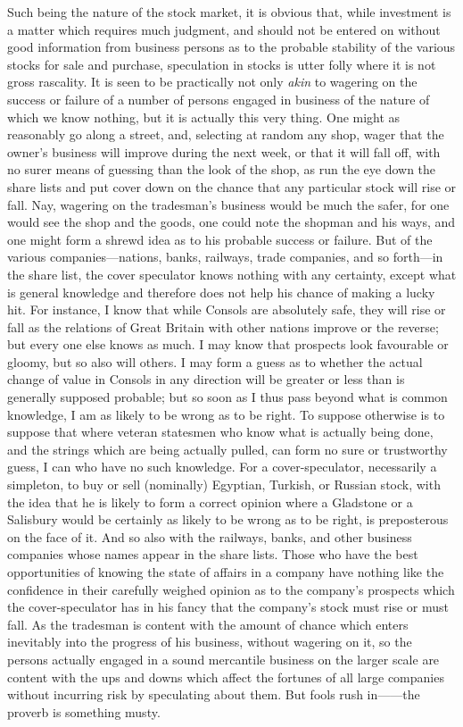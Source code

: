 \documentclass[letterpaper,12pt,oneside,openany]{memoir}
\begin{document}
Such being the nature of the stock market, it is
obvious that, while investment is a matter which
requires much judgment, and should not be entered on
without good information from business persons as to
the probable stability of the various stocks for sale and
purchase, speculation in stocks is utter folly where it is
not gross rascality. It is seen to be practically not
only \emph{akin} to wagering on the success or failure of a
number of persons engaged in business of the nature of
which we know nothing, but it is actually this very
thing. One might as reasonably go along a street, and,
selecting at random any shop, wager that the owner's
business will improve during the next week, or that it
will fall off, with no surer means of guessing than the
look of the shop, as run the eye down the share lists
and put cover down on the chance that any particular
stock will rise or fall. Nay, wagering on the tradesman's
business would be much the safer, for one would
see the shop and the goods, one could note the shopman
and his ways, and one might form a shrewd idea as to
his probable success or failure. But of the various
companies---nations, banks, railways, trade companies,
and so forth---in the share list, the cover speculator
knows nothing with any certainty, except what is general
knowledge and therefore does not help his chance of
making a lucky hit. For instance, I know that while
Consols are absolutely safe, they will rise or fall as the
relations of Great Britain with other nations improve
or the reverse; but every one else knows as much. I
may know that prospects look favourable or gloomy,
but so also will others. I may form a guess as to
whether the actual change of value in Consols in any
direction will be greater or less than is generally supposed
probable; but so soon as I thus pass beyond what
is common knowledge, I am as likely to be wrong as to
be right. To suppose otherwise is to suppose that
where veteran statesmen who know what is actually
being done, and the strings which are being actually
pulled, can form no sure or trustworthy guess, I can
who have no such knowledge. For a cover-speculator,
necessarily a simpleton, to buy or sell (nominally)
Egyptian, Turkish, or Russian stock, with the idea that
he is likely to form a correct opinion where a Gladstone
or a Salisbury would be certainly as likely to be wrong
as to be right, is preposterous on the face of it. And
so also with the railways, banks, and other business
companies whose names appear in the share lists.
Those who have the best opportunities of knowing the
state of affairs in a company have nothing like the
confidence in their carefully weighed opinion as to the
company's prospects which the cover-speculator has in
his fancy that the company's stock must rise or must
fall. As the tradesman is content with the amount of
chance which enters inevitably into the progress of his
business, without wagering on it, so the persons actually
engaged in a sound mercantile business on the larger
scale are content with the ups and downs which affect
the fortunes of all large companies without incurring
risk by speculating about them. But fools rush in------the
proverb is something musty.
\end{document}
